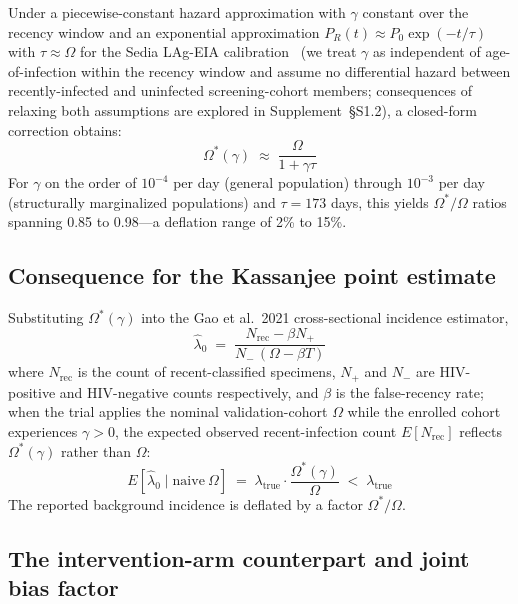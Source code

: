 \documentclass[11pt]{article}
\begin{document}
Under a piecewise-constant hazard approximation with $\gamma$ constant over the recency window and an exponential approximation $P_R(t) \approx P_0\exp(-t/\tau)$ with $\tau \approx \Omega$ for the Sedia LAg-EIA calibration~\cite{sedialag} (we treat $\gamma$ as independent of age-of-infection within the recency window and assume no differential hazard between recently-infected and uninfected screening-cohort members; consequences of relaxing both assumptions are explored in Supplement~\S S1.2), a closed-form correction obtains:
\begin{equation}
\Omega^*(\gamma) \;\approx\; \frac{\Omega}{1 + \gamma\tau} \label{eq:omega_closed}
\end{equation}
For $\gamma$ on the order of $10^{-4}$ per day (general population) through $10^{-3}$ per day (structurally marginalized populations) and $\tau = 173$ days, this yields $\Omega^*/\Omega$ ratios spanning 0.85 to 0.98---a deflation range of 2\% to 15\%.

\subsection{Consequence for the Kassanjee point estimate}

Substituting $\Omega^*(\gamma)$ into the Gao et al.\ 2021 cross-sectional incidence estimator,
\begin{equation}
\hat\lambda_0 \;=\; \frac{N_{\mathrm{rec}} - \beta N_+}{N_-\,(\Omega - \beta T)} \label{eq:kassanjee}
\end{equation}
where $N_{\mathrm{rec}}$ is the count of recent-classified specimens, $N_+$ and $N_-$ are HIV-positive and HIV-negative counts respectively, and $\beta$ is the false-recency rate; when the trial applies the nominal validation-cohort $\Omega$ while the enrolled cohort experiences $\gamma > 0$, the expected observed recent-infection count $E[N_{\mathrm{rec}}]$ reflects $\Omega^*(\gamma)$ rather than $\Omega$:
\begin{equation}
E[\hat\lambda_0 \mid \mathrm{naive}\ \Omega] \;=\; \lambda_{\mathrm{true}} \cdot \frac{\Omega^*(\gamma)}{\Omega} \;<\; \lambda_{\mathrm{true}}
\end{equation}
The reported background incidence is deflated by a factor $\Omega^*/\Omega$.

\subsection{The intervention-arm counterpart and joint bias factor}
\end{document}
